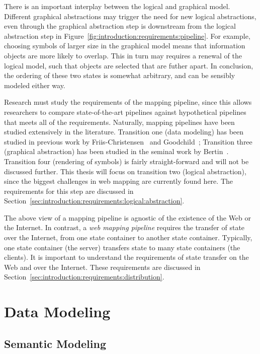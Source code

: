 \documentclass[11pt, oneside]{report}
\begin{document}
{There is an important interplay between the logical and graphical model. Different graphical abstractions may trigger the need for new logical abstractions, even through the graphical abstraction step is downstream from the logical abstraction step in Figure~\ref{fig:introduction:requirements:pipeline}. For example, choosing symbols of larger size in the graphical model means that information objects are more likely to overlap. This in turn may requires a renewal of the logical model, such that objects are selected that are futher apart. In conclusion, the ordering of these two states is somewhat arbitrary, and can be sensibly modeled either way.

Research must study the requirements of the mapping pipeline, since this allows researchers to compare state-of-the-art pipelines against hypothetical pipelines that meets all of the requirements. Naturally, mapping pipelines have been studied extensively in the literature. Transition one (data modeling) has been studied in previous work by Friis-Christensen~\cite{friis2001requirements} and Goodchild~\cite{goodchild1992geographical}; Transition three (graphical abstraction) has been studied in the seminal work by Bertin~\cite{bertin1967semiologie}. Transition four (rendering of symbols) is fairly straight-forward and will not be discussed further. This thesis will focus on transition two (logical abstraction), since the biggest challenges in web mapping are currently found here. The requirements for this step are discussed in Section~\ref{sec:introduction:requirements:logical:abstraction}.

The above view of a mapping pipeline is agnostic of the existence of the Web or the Internet. In contrast, a \emph{web mapping pipeline} requires the transfer of state over the Internet, from one state container to another state container. Typically, one state container (the server) transfers state to many state containers (the clients). It is important to understand the requirements of state transfer on the Web and over the Internet. These requirements are discussed in Section~\ref{sec:introduction:requirements:distribution}.

\section{Data Modeling}

\subsection{Semantic Modeling}

}
\end{document}
